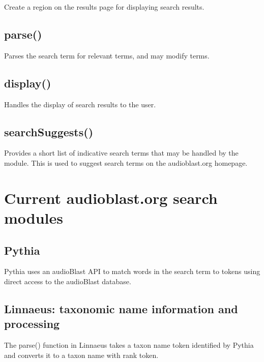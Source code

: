 \documentclass[
]{book}
\begin{document}
Create a region on the results page for displaying search results.

\hypertarget{parse}{%
\subsection{parse()}\label{parse}}

Parses the search term for relevant terms, and may modify terms.

\hypertarget{display}{%
\subsection{display()}\label{display}}

Handles the display of search results to the user.

\hypertarget{searchsuggests}{%
\subsection{searchSuggests()}\label{searchsuggests}}

Provides a short list of indicative search terms that may be handled by the module. This is used to suggest search terms on the audioblast.org homepage.

\hypertarget{current-audioblast.org-search-modules}{%
\section{Current audioblast.org search modules}\label{current-audioblast.org-search-modules}}

\hypertarget{pythia}{%
\subsection{Pythia}\label{pythia}}

Pythia uses an audioBlast API to match words in the search term to tokens using direct access to the audioBlast database.

\hypertarget{linnaeus-taxonomic-name-information-and-processing}{%
\subsection{Linnaeus: taxonomic name information and processing}\label{linnaeus-taxonomic-name-information-and-processing}}

The parse() function in Linnaeus takes a taxon name token identified by Pythia and converts it to a taxon name with rank token.
\end{document}
